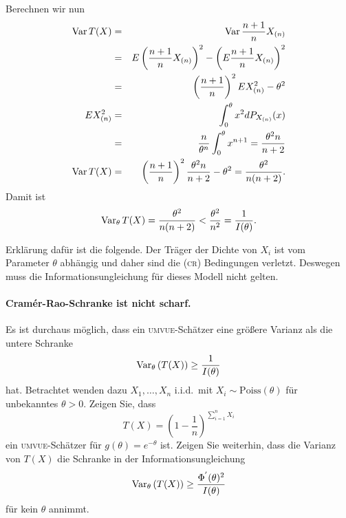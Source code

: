 Berechnen wir nun
\begin{eqnarray}
    \operatorname{Var} T(X) &=& \operatorname{Var} \frac{n+1}{n} X_{(n)} \\
    &=& E\left( \frac{n+1}{n} X_{(n)} \right)^2 - \left( E \frac{n+1}{n} X_{(n)} \right)^2 \\
    &=& \left( \frac{n+1}{n} \right)^2 E X_{(n)}^2 - \theta^2 \\
    E X_{(n)}^2 &=& \int_{0}^{\theta} x^2 d P_{X_{(n)}}(x) \\
    &=& \frac{n}{\theta^n} \int_{0}^{\theta} x^{n+1} = \frac{\theta^2 n}{n+2} \\
    \operatorname{Var} T(X) &=& \left( \frac{n+1}{n} \right)^2 \frac{\theta^2 n }{n+2} - \theta^2 = \frac{\theta^2}{n(n+2)}.
\end{eqnarray}
Damit ist 
\begin{equation}
    \operatorname{Var}_\theta T(X) = \frac{\theta^2}{n(n+2)} < \frac{\theta^2}{n^2} = \frac{1}{I(\theta)}.
\end{equation}

Erklärung dafür ist die folgende. Der
Träger der Dichte von $X_i$ ist vom Parameter $\theta$ abhängig und daher sind
die \textsc{(cr)} Bedingungen verletzt.  Deswegen muss die
Informationsungleichung für dieses Modell nicht gelten. 







\paragraph{Cram\'er-Rao-Schranke ist nicht scharf.    } 
Es ist durchaus möglich, dass ein \textsc{umvue}-Schätzer eine größere Varianz als die untere
Schranke
\begin{equation}
	\operatorname{Var}_\theta \left( T(X) \right) \geq \frac{1}{I(\theta)}
\end{equation}
hat. Betrachtet wenden dazu $X_1,\ldots,X_n$ i.i.d.\ mit $X_i \sim \textrm{Poiss}(\theta)$ für 
unbekanntes $\theta>0$. Zeigen Sie, dass
\begin{equation}
	T(X) = \left( 1- \frac{1}{n} \right)^{ \sum_{i=1}^{n} X_i}
\end{equation}
ein \textsc{umvue}-Schätzer für $g(\theta)=e^{-\theta}$ ist. Zeigen Sie weiterhin, dass die
Varianz von $T(X)$ die Schranke in der Informationsungleichung
\begin{equation}
	\operatorname{Var}_\theta\left( T(X) \right) \geq \frac{\Phi^{'}(\theta)^2}{I(\theta)}
\end{equation}
für kein $\theta$ annimmt.

